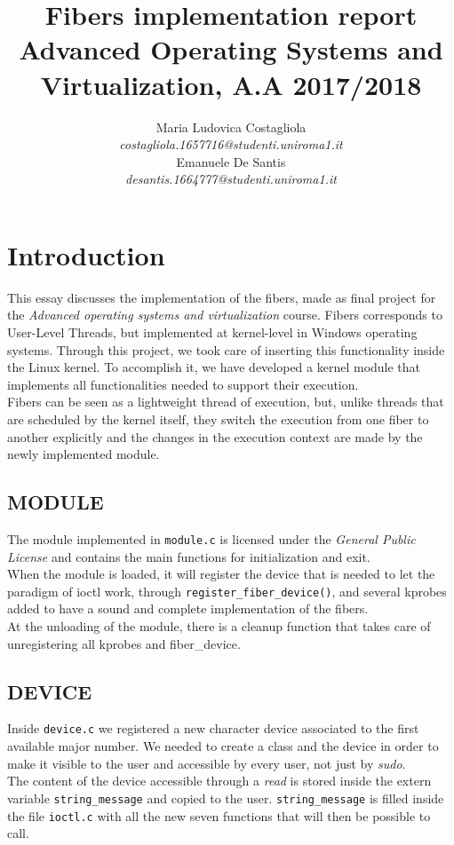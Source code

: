 \documentclass[a4paper]{article}
\author{\large Maria Ludovica Costagliola \\
        \small \textit{costagliola.1657716@studenti.uniroma1.it} \medskip\\
        \large Emanuele De Santis \\
        \small \textit{desantis.1664777@studenti.uniroma1.it}}
\title{Fibers implementation report\\
        \smallskip
        \small Advanced Operating Systems and Virtualization, A.A 2017/2018}
\date{}
\begin{document}
\maketitle
\section{Introduction}
This essay discusses the implementation of the fibers, made as final project for the \textit{Advanced operating systems and virtualization} course. Fibers corresponds to User-Level Threads, but implemented at kernel-level in Windows operating systems. Through this project, we took care of inserting this functionality inside the Linux kernel. To accomplish it, we have developed a kernel module that implements all functionalities needed to support their execution.\bigskip\\
Fibers can be seen as a lightweight thread of execution, but, unlike threads that are scheduled by the kernel itself, they switch the execution from one fiber to another explicitly and the changes in the execution context are made by the newly implemented module.

\subsection*{MODULE}
The module implemented in \texttt{module.c} is licensed under the \textit{General Public License} and contains the main functions for initialization and exit.\bigskip\\
When the module is loaded, it will register the device that is needed to let the paradigm of ioctl work, through \texttt{register\_fiber\_device()}, and several kprobes added to have a sound and complete implementation of the fibers.\bigskip\\
At the unloading of the module, there is a cleanup function that takes care of unregistering all kprobes and fiber\_device.

\subsection*{DEVICE}
Inside \texttt{device.c} we registered a new character device associated to the first available major number. We needed to create a class and the device in order to make it visible to the user and accessible by every user, not just by \textit{sudo}.\bigskip\\
The content of the device accessible through a \textit{read} is stored inside the extern variable \texttt{string\_message} and copied to the user. \texttt{string\_message} is filled inside the file \texttt{ioctl.c} with all the new seven functions that will then be possible to call.
\end{document}
